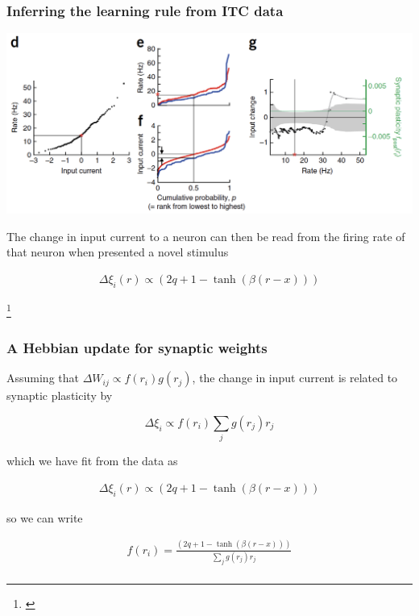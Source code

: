 \documentclass[aspectratio=169]{beamer}
\begin{document}
\begin{frame}[plain]
\frametitle{Inferring the learning rule from ITC data}

\begin{center}
\includegraphics[scale=0.55]{learning-rules}
\end{center}

The change in input current to a neuron can then be read from the firing rate of that neuron when presented a novel stimulus

\begin{align*}
\Delta \xi_{i}(r) \propto (2q + 1 - \tanh (\beta (r-x)))
\end{align*}

\footnote{\cite{lim}}

\end{frame}

\begin{frame}[plain]
\frametitle{A Hebbian update for synaptic weights}

Assuming that $\Delta W_{ij} \propto f(r_{i})g(r_{j})$, the change in input current is related to synaptic plasticity by

\begin{equation*}
\Delta \xi_{i}  \propto  f(r_{i}) \sum_{j} g(r_{j})r_{j}
\end{equation*}

which we have fit from the data as 

\begin{align*}
\Delta \xi_{i}(r) \propto (2q + 1 - \tanh (\beta (r-x)))
\end{align*}

so we can write

\begin{align*}
f(r_{i}) =  \frac{(2q + 1 - \tanh (\beta (r-x)))}{\sum_{j} g(r_{j})r_{j}}\\
\end{align*}


\end{frame}
\end{document}
